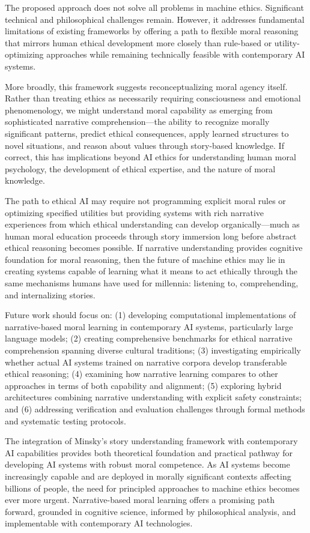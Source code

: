 \documentclass[12pt]{article}
\begin{document}
The proposed approach does not solve all problems in machine ethics. Significant technical and philosophical challenges remain. However, it addresses fundamental limitations of existing frameworks by offering a path to flexible moral reasoning that mirrors human ethical development more closely than rule-based or utility-optimizing approaches while remaining technically feasible with contemporary AI systems.

More broadly, this framework suggests reconceptualizing moral agency itself. Rather than treating ethics as necessarily requiring consciousness and emotional phenomenology, we might understand moral capability as emerging from sophisticated narrative comprehension---the ability to recognize morally significant patterns, predict ethical consequences, apply learned structures to novel situations, and reason about values through story-based knowledge. If correct, this has implications beyond AI ethics for understanding human moral psychology, the development of ethical expertise, and the nature of moral knowledge.

The path to ethical AI may require not programming explicit moral rules or optimizing specified utilities but providing systems with rich narrative experiences from which ethical understanding can develop organically---much as human moral education proceeds through story immersion long before abstract ethical reasoning becomes possible. If narrative understanding provides cognitive foundation for moral reasoning, then the future of machine ethics may lie in creating systems capable of learning what it means to act ethically through the same mechanisms humans have used for millennia: listening to, comprehending, and internalizing stories.

Future work should focus on: (1) developing computational implementations of narrative-based moral learning in contemporary AI systems, particularly large language models; (2) creating comprehensive benchmarks for ethical narrative comprehension spanning diverse cultural traditions; (3) investigating empirically whether actual AI systems trained on narrative corpora develop transferable ethical reasoning; (4) examining how narrative learning compares to other approaches in terms of both capability and alignment; (5) exploring hybrid architectures combining narrative understanding with explicit safety constraints; and (6) addressing verification and evaluation challenges through formal methods and systematic testing protocols.

The integration of Minsky's story understanding framework with contemporary AI capabilities provides both theoretical foundation and practical pathway for developing AI systems with robust moral competence. As AI systems become increasingly capable and are deployed in morally significant contexts affecting billions of people, the need for principled approaches to machine ethics becomes ever more urgent. Narrative-based moral learning offers a promising path forward, grounded in cognitive science, informed by philosophical analysis, and implementable with contemporary AI technologies.
\end{document}
